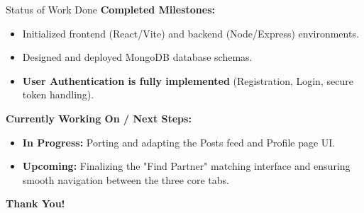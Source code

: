 \documentclass[11pt]{beamer}
\begin{document}
\begin{frame}{Status of Work Done}
    \textbf{Completed Milestones:}
    \begin{itemize}
        \item \checkmark Initialized frontend (React/Vite) and backend (Node/Express) environments.
        \item \checkmark Designed and deployed MongoDB database schemas.
        \item \checkmark \textbf{User Authentication is fully implemented} (Registration, Login, secure token handling).
    \end{itemize}
    \vspace{0.5cm}
    \textbf{Currently Working On / Next Steps:}
    \begin{itemize}
        \item \textbf{In Progress:} Porting and adapting the Posts feed and Profile page UI.
        \item \textbf{Upcoming:} Finalizing the "Find Partner" matching interface and ensuring smooth navigation between the three core tabs.
    \end{itemize}
\end{frame}

\begin{frame}
    \begin{center}
        \Huge \textbf{Thank You!} \\ \vspace{0.5cm}
    \end{center}
\end{frame}
\end{document}
